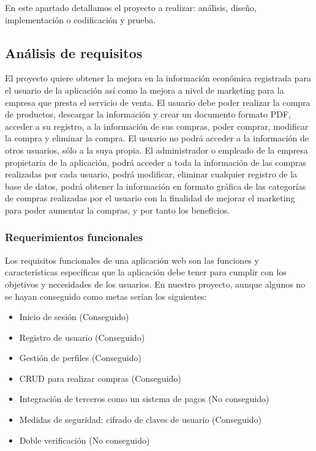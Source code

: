 \documentclass{article}
\begin{document}
En este apartado detallamos el proyecto a realizar: análisis, diseño, implementación o codificación y prueba.

\subsection{Análisis de requisitos}
El proyecto quiere obtener la mejora en la información económica registrada para el usuario de la aplicación así como la mejora a nivel de marketing para la empresa que presta el servicio de venta. El usuario debe poder realizar la compra de productos, descargar la información y crear un documento formato PDF, acceder a su registro, a la información de sus compras, poder comprar, modificar la compra y eliminar la compra. El usuario no podrá acceder a la información de otros usuarios, sólo a la suya propia.
El administrador o empleado de la empresa propietaria de la aplicación, podrá acceder a toda la información de las compras realizadas por cada usuario, podrá modificar, eliminar cualquier registro de la base de datos, podrá obtener la información en formato gráfica de las categorías de compras realizadas por el usuario con la finalidad de mejorar el marketing para poder aumentar la compras, y por tanto los beneficios.


\subsubsection{Requerimientos funcionales}
Los requisitos funcionales de una aplicación web son las funciones y características específicas que la aplicación debe tener para cumplir con los objetivos y necesidades de los usuarios.
En nuestro proyecto, aunque algunos no se hayan conseguido como metas serían los siguientes:\\
\begin{itemize}
    \item Inicio de sesión (Conseguido)
    \item Registro de usuario (Conseguido)
    \item Gestión de perfiles (Conseguido)
    \item CRUD para realizar compras (Conseguido)
    \item Integración de terceros como un sistema de pagos (No conseguido)
    \item Medidas de seguridad: cifrado de claves de usuario (Conseguido)
    \item Doble verificación (No conseguido)
\end{itemize}
\end{document}
